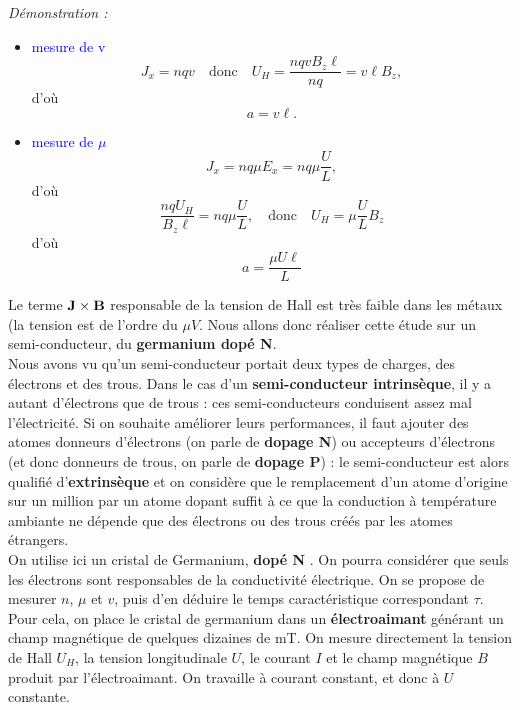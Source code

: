 \documentclass[11pt,a4paper]{report}
\begin{document}
\textit{Démonstration :}
\begin{itemize}
	\item \textcolor{blue}{mesure de v}
	\begin{equation}
		J_x = nqv \quad\text{donc}\quad U_H = \frac{nqvB_z\ell}{nq} = v\ell B_z,
	\end{equation}
	d'où
	\begin{equation}
		\boxed{a = v\ell}.
	\end{equation}
	\item \textcolor{blue}{mesure de $\mu$}
	\begin{equation}
		J_x = n q \mu E_x = n q \mu \frac{U}{L},
	\end{equation}
	d'où
	\begin{equation}
		\frac{n q U_H}{B_z \ell} = n q \mu \frac{U}{L}, \quad\text{donc}\quad U_H = \mu \frac{U}{L} B_z
	\end{equation}
	d'où
	\begin{equation}
		\boxed{a = \frac{\mu U \ell}{L}}
	\end{equation}
\end{itemize}

Le terme $\bold{J}\times\bold{B}$ responsable de la tension de Hall est très faible dans les métaux (la tension est de l'ordre du $\mu V$. Nous allons donc réaliser cette étude sur un semi-conducteur, du \textbf{germanium dopé N}.\\

Nous avons vu qu'un semi-conducteur portait deux types de charges, des électrons et des trous. Dans le cas d'un \textbf{semi-conducteur intrinsèque}, il y a autant d'électrons que de trous : ces semi-conducteurs conduisent assez mal l'électricité. Si on souhaite améliorer leurs performances, il faut ajouter des atomes donneurs d'électrons (on parle de \textbf{dopage N}) ou accepteurs d'électrons (et donc donneurs de trous, on parle de \textbf{dopage P}) : le semi-conducteur est alors qualifié d'\textbf{extrinsèque} et on considère que le remplacement d'un atome d'origine sur un million par un atome dopant suffit à ce que la conduction à température ambiante ne dépende que des électrons ou des trous créés par les atomes étrangers.\\

On utilise ici un cristal de Germanium, \textbf{dopé N} . On pourra considérer que seuls les électrons sont responsables de la conductivité électrique. On se propose de mesurer $n$, $\mu$ et $v$, puis d'en déduire le temps caractéristique correspondant $\tau$. Pour cela, on place le cristal de germanium dans un \textbf{électroaimant} générant un champ magnétique de quelques dizaines de mT. On mesure directement la tension de Hall $U_H$, la tension longitudinale $U$, le courant $I$ et le champ magnétique $B$ produit par l'électroaimant. On travaille à courant constant, et donc à $U$ constante.\\
\end{document}
